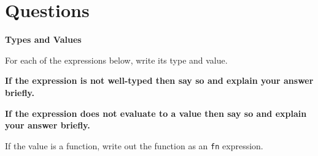 \documentclass[addpoints,12pt, answers]{exam}
\begin{document}
\newpage


\section*{Questions}

\begin{questions}

\textbf{Types and Values}

For each of the expressions below, write its type and value.

\textbf{If the expression is not well-typed then say so and explain your answer briefly.}

\textbf{If the expression does not evaluate to a value then say so and explain your answer briefly.}

If the value is a function, write out the function as an \texttt{fn} expression.

\end{questions}
\end{document}
